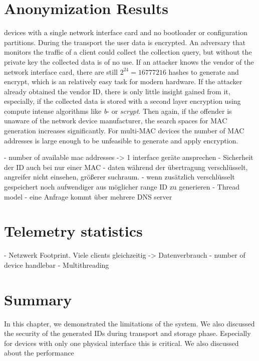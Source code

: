 %
\newpage
%
 


\section{Anonymization Results}
\label{sec:results:anon}
    devices with a single network interface card and no bootloader or configuration partitions. During the transport the user data is encrypted. An adversary that monitors the traffic of a client could collect the collection query, but without the private key the collected data is of no use. If an attacker knows the vendor of the network interface card, there are still $2^{24} = 16777216$ hashes to generate and encrypt, which is an relatively easy task for modern hardware. If the attacker already obtained the vendor ID, there is only little insight gained from it, especially, if the collected data is stored with a second layer encryption using compute intense algorithms like \textit{b}- or \textit{scrypt}. 
    Then again, if the offender is unaware of the network device manufacturer, the search spaces for MAC generation increases significantly.
    For multi-MAC devices the number of MAC addresses is large enough to be unfeasible to generate and apply encryption.


- number of available mac addresses -> 1 interface geräte ansprechen
- Sicherheit der ID auch bei nur einer MAC
- daten während der übertragung verschlüsselt, angreifer nicht einsehen, größerer suchraum.
- wenn zusätzlich verschlüsselt gespeichert noch aufwendiger aus möglicher range ID zu generieren
- Thread model
- eine Anfrage kommt über mehrere DNS server


%


\section{Telemetry statistics}
\label{sec:results:telemetry}
%
- Netzwerk Footprint. Viele clients gleichzeitig -> Datenverbrauch
- number of device handlebar
- Multithreading

\section{Summary}
In this chapter, we demonstrated the limitations of the system. We also discussed the security of the generated IDs during transport and storage phase. Especially for devices with only one physical interface this is critical. We also discussed about the performance 



